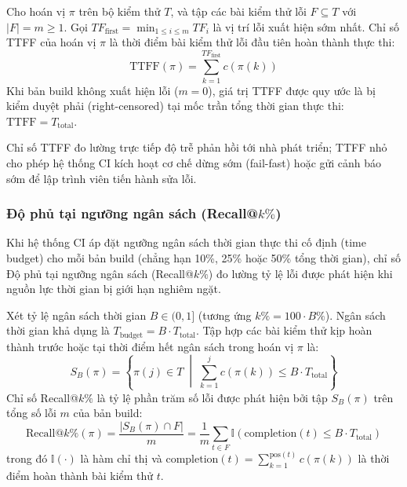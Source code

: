 \begin{dn}
\label{def:ttff_metric}
Cho hoán vị $\pi$ trên bộ kiểm thử $T$, và tập các bài kiểm thử lỗi $F \subseteq T$ với $|F| = m \ge 1$. Gọi $TF_{\text{first}} = \min_{1 \le i \le m} TF_i$ là vị trí lỗi xuất hiện sớm nhất. Chỉ số TTFF của hoán vị $\pi$ là thời điểm bài kiểm thử lỗi đầu tiên hoàn thành thực thi:
\begin{equation}
\label{eq:ttff_formula}
\text{TTFF}(\pi) = \sum_{k=1}^{TF_{\text{first}}} c(\pi(k))
\end{equation}
Khi bản build không xuất hiện lỗi ($m = 0$), giá trị TTFF được quy ước là bị kiểm duyệt phải (right-censored) tại mốc trần tổng thời gian thực thi: $\text{TTFF} = T_{\text{total}}$.
\end{dn}

Chỉ số TTFF đo lường trực tiếp độ trễ phản hồi tới nhà phát triển; TTFF nhỏ cho phép hệ thống CI kích hoạt cơ chế dừng sớm (fail-fast) hoặc gửi cảnh báo sớm để lập trình viên tiến hành sửa lỗi.

\subsubsection{Độ phủ tại ngưỡng ngân sách (Recall@\texorpdfstring{$k\%$}{k\%})}
\label{subsubsec:recall_budget_metric}

Khi hệ thống CI áp đặt ngưỡng ngân sách thời gian thực thi cố định (time budget) cho mỗi bản build (chẳng hạn 10\%, 25\% hoặc 50\% tổng thời gian), chỉ số Độ phủ tại ngưỡng ngân sách (Recall@$k\%$) đo lường tỷ lệ lỗi được phát hiện khi nguồn lực thời gian bị giới hạn nghiêm ngặt.

\begin{dn}
\label{def:recall_budget_metric}
Xét tỷ lệ ngân sách thời gian $B \in (0, 1]$ (tương ứng $k\% = 100 \cdot B\%$). Ngân sách thời gian khả dụng là $T_{\text{budget}} = B \cdot T_{\text{total}}$. Tập hợp các bài kiểm thử kịp hoàn thành trước hoặc tại thời điểm hết ngân sách trong hoán vị $\pi$ là:
\begin{equation}
S_B(\pi) = \left\{ \pi(j) \in T \;\middle|\; \sum_{k=1}^j c(\pi(k)) \le B \cdot T_{\text{total}} \right\}
\end{equation}
Chỉ số Recall@$k\%$ là tỷ lệ phần trăm số lỗi được phát hiện bởi tập $S_B(\pi)$ trên tổng số lỗi $m$ của bản build:
\begin{equation}
\label{eq:recall_formula}
\text{Recall@}k\%(\pi) = \frac{|S_B(\pi) \cap F|}{m} = \frac{1}{m} \sum_{t \in F} \mathbb{I}\left( \text{completion}(t) \le B \cdot T_{\text{total}} \right)
\end{equation}
trong đó $\mathbb{I}(\cdot)$ là hàm chỉ thị và $\text{completion}(t) = \sum_{k=1}^{\text{pos}(t)} c(\pi(k))$ là thời điểm hoàn thành bài kiểm thử $t$.
\end{dn}

